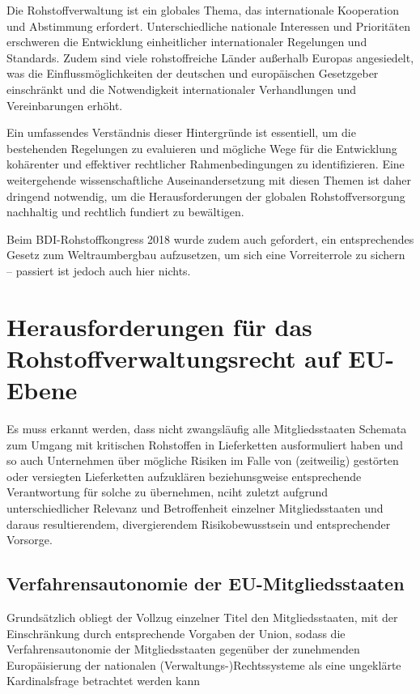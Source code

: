 \documentclass[12pt,a4paper,oneside]{book} %
\begin{document}
Die Rohstoffverwaltung ist ein globales Thema, das internationale Kooperation und Abstimmung erfordert. Unterschiedliche nationale Interessen und Prioritäten erschweren die Entwicklung einheitlicher internationaler Regelungen und Standards. Zudem sind viele rohstoffreiche Länder außerhalb Europas angesiedelt, was die Einflussmöglichkeiten der deutschen und europäischen Gesetzgeber einschränkt und die Notwendigkeit internationaler Verhandlungen und Vereinbarungen erhöht.

Ein umfassendes Verständnis dieser Hintergründe ist essentiell, um die bestehenden Regelungen zu evaluieren und mögliche Wege für die Entwicklung kohärenter und effektiver rechtlicher Rahmenbedingungen zu identifizieren. Eine weitergehende wissenschaftliche Auseinandersetzung mit diesen Themen ist daher dringend notwendig, um die Herausforderungen der globalen Rohstoffversorgung nachhaltig und rechtlich fundiert zu bewältigen.

Beim BDI-Rohstoffkongress 2018 wurde zudem auch gefordert, ein entsprechendes Gesetz zum Weltraumbergbau aufzusetzen, um sich eine Vorreiterrole zu sichern -- passiert ist jedoch auch hier nichts.



\section{Herausforderungen für das Rohstoffverwaltungsrecht auf EU-Ebene}
Es muss erkannt werden, dass nicht zwangsläufig alle Mitgliedsstaaten Schemata zum Umgang mit kritischen Rohstoffen in Lieferketten ausformuliert haben und so auch Unternehmen über mögliche Risiken im Falle von (zeitweilig) gestörten oder versiegten Lieferketten aufzuklären beziehunsgweise entsprechende Verantwortung für solche zu übernehmen, nciht zuletzt aufgrund unterschiedlicher Relevanz und Betroffenheit einzelner Mitgliedsstaaten und daraus resultierendem, divergierendem Risikobewusstsein und entsprechender Vorsorge.

\subsection{Verfahrensautonomie der EU-Mitgliedsstaaten}
Grundsätzlich obliegt der Vollzug einzelner Titel den Mitgliedsstaaten, mit der Einschränkung durch entsprechende Vorgaben der Union, sodass die Verfahrensautonomie der Mitgliedsstaaten gegenüber der zunehmenden Europäisierung der nationalen (Verwaltungs-)Rechtssysteme als eine \glqq ungeklärte Kardinalsfrage\grqq \autocite{Ludiwgs, NVwZ 2018, 1417} betrachtet werden kann
\end{document}
